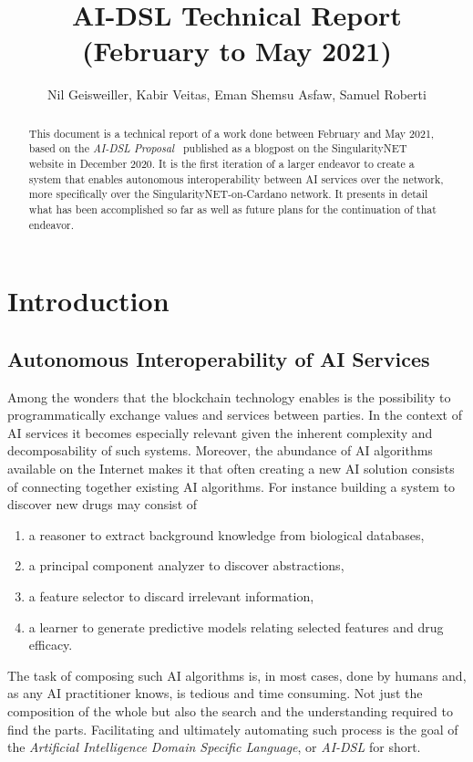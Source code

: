\documentclass[]{report}
\begin{document}
\title{AI-DSL Technical Report (February to May 2021)}
\author{Nil Geisweiller, Kabir Veitas, Eman Shemsu Asfaw, Samuel Roberti}
\maketitle

\begin{abstract}
This document is a technical report of a work done between February
and May 2021, based on the \emph{AI-DSL
Proposal}~\cite{GoertzelGeisweillerBlog} published as a blogpost on
the SingularityNET website in December 2020.  It is the first
iteration of a larger endeavor to create a system that enables
autonomous interoperability between AI services over the network, more
specifically over the SingularityNET-on-Cardano network.  It presents
in detail what has been accomplished so far as well as future plans
for the continuation of that endeavor.
\end{abstract}

\tableofcontents

\chapter{Introduction}
\section{Autonomous Interoperability of AI Services}
Among the wonders that the blockchain technology enables is the
possibility to programmatically exchange values and services between
parties.  In the context of AI services it becomes especially relevant
given the inherent complexity and decomposability of such systems.
Moreover, the abundance of AI algorithms available on the Internet
makes it that often creating a new AI solution consists of connecting
together existing AI algorithms.  For instance building a system to
discover new drugs may consist of
\begin{enumerate}
\item a reasoner to extract background knowledge from biological
  databases,
\item a principal component analyzer to discover abstractions,
\item a feature selector to discard irrelevant information,
\item a learner to generate predictive models relating selected
  features and drug efficacy.
\end{enumerate}
The task of composing such AI algorithms is, in most cases, done by
humans and, as any AI practitioner knows, is tedious and time
consuming.  Not just the composition of the whole but also the search
and the understanding required to find the parts.  Facilitating and
ultimately automating such process is the goal of the \emph{Artificial
Intelligence Domain Specific Language}, or \emph{AI-DSL} for short.
\end{document}
